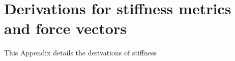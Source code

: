 \section{Derivations for stiffness metrics and force vectors}
This Appendix details the derivations of stiffness
